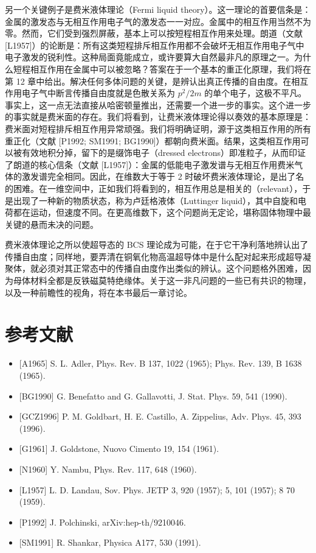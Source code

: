 另一个关键例子是费米液体理论（Fermi liquid theory）。这一理论的首要信条是：金属的激发态与无相互作用电子气的激发态一一对应。金属中的相互作用当然不为零。然而，它们受到强烈屏蔽，基本上可以按短程相互作用来处理。朗道（文献 [L1957]）的论断是：所有这类短程排斥相互作用都不会破坏无相互作用电子气中电子激发的锐利性。这种局面竟能成立，或许要算大自然最非凡的原理之一。为什么短程相互作用在金属中可以被忽略？答案在于一个基本的重正化原理，我们将在第 12 章中给出。解决任何多体问题的关键，是辨认出真正传播的自由度。在相互作用电子气中断言传播自由度就是色散关系为 $p^2/2m$ 的单个电子，这极不平凡。事实上，这一点无法直接从哈密顿量推出，还需要一个进一步的事实。这个进一步的事实就是费米面的存在。我们将看到，让费米液体理论得以奏效的基本原理是：费米面对短程排斥相互作用异常顽强。我们将明确证明，源于这类相互作用的所有重正化（文献 [P1992; SM1991; BG1990]）都朝向费米面。结果，这类相互作用可以被有效地积分掉，留下的是缀饰电子（dressed electrons）即准粒子，从而印证了朗道的核心信条（文献 [L1957]）：金属的低能电子激发谱与无相互作用费米气体的激发谱完全相同。因此，在维数大于等于 2 时破坏费米液体理论，是出了名的困难。在一维空间中，正如我们将看到的，相互作用总是相关的（relevant），于是出现了一种新的物质状态，称为卢廷格液体（Luttinger liquid），其中自旋和电荷都在运动，但速度不同。在更高维数下，这个问题尚无定论，堪称固体物理中最关键的悬而未决的问题。

费米液体理论之所以使超导态的 BCS 理论成为可能，在于它干净利落地辨认出了传播自由度；同样地，要弄清在铜氧化物高温超导体中是什么配对起来形成超导凝聚体，就必须对其正常态中的传播自由度作出类似的辨认。这个问题格外困难，因为母体材料全都是反铁磁莫特绝缘体。关于这一非凡问题的一些已有共识的物理，以及一种前瞻性的视角，将在本书最后一章讨论。

\section*{参考文献}
\begin{itemize}[leftmargin=2em,itemsep=0pt,parsep=0pt,label={}]
\item {[}A1965] S. L. Adler, Phys. Rev. B 137, 1022 (1965); Phys. Rev. 139, B 1638 (1965).
\item {[}BG1990] G. Benefatto and G. Gallavotti, J. Stat. Phys. 59, 541 (1990).
\item {[}GCZ1996] P. M. Goldbart, H. E. Castillo, A. Zippelius, Adv. Phys. 45, 393 (1996).
\item {[}G1961] J. Goldstone, Nuovo Cimento 19, 154 (1961).
\item {[}N1960] Y. Nambu, Phys. Rev. 117, 648 (1960).
\item {[}L1957] L. D. Landau, Sov. Phys. JETP 3, 920 (1957); 5, 101 (1957); 8 70 (1959).
\item {[}P1992] J. Polchinski, arXiv:hep-th/9210046.
\item {[}SM1991] R. Shankar, Physica A177, 530 (1991).
\end{itemize}
